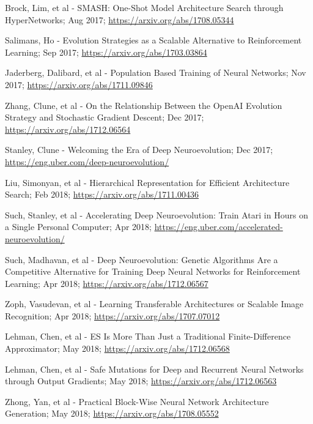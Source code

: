 \documentclass[journal, a4paper]{IEEEtran}
\begin{document}
\begin{thebibliography}{5}
    Brock, Lim, et al - SMASH: One-Shot Model Architecture Search through HyperNetworks; Aug 2017;
    \url{https://arxiv.org/abs/1708.05344}

    Salimans, Ho - Evolution Strategies as a Scalable Alternative to Reinforcement Learning; Sep 2017;
    \url{https://arxiv.org/abs/1703.03864}

    Jaderberg, Dalibard, et al - Population Based Training of Neural Networks; Nov 2017;
    \url{https://arxiv.org/abs/1711.09846}

    Zhang, Clune, et al - On the Relationship Between the OpenAI Evolution Strategy and Stochastic Gradient Descent; Dec 2017;
    \url{https://arxiv.org/abs/1712.06564}

    Stanley, Clune - Welcoming the Era of Deep Neuroevolution; Dec 2017;
    \url{https://eng.uber.com/deep-neuroevolution/}

    Liu, Simonyan, et al - Hierarchical Representation for Efficient Architecture Search; Feb 2018;
    \url{https://arxiv.org/abs/1711.00436}

    Such, Stanley, et al - Accelerating Deep Neuroevolution: Train Atari in Hours on a Single Personal Computer; Apr 2018;
    \url{https://eng.uber.com/accelerated-neuroevolution/}

    Such, Madhavan, et al - Deep Neuroevolution: Genetic Algorithms Are a Competitive Alternative for Training Deep Neural Networks for Reinforcement Learning; Apr 2018;
    \url{https://arxiv.org/abs/1712.06567}

    Zoph, Vasudevan, et al - Learning Transferable Architectures or Scalable Image Recognition; Apr 2018;
    \url{https://arxiv.org/abs/1707.07012}

    Lehman, Chen, et al - ES Is More Than Just a Traditional Finite-Difference Approximator; May 2018;
    \url{https://arxiv.org/abs/1712.06568}

    Lehman, Chen, et al - Safe Mutations for Deep and Recurrent Neural Networks through Output Gradients; May 2018;
    \url{https://arxiv.org/abs/1712.06563}

    Zhong, Yan, et al - Practical Block-Wise Neural Network Architecture Generation; May 2018;
    \url{https://arxiv.org/abs/1708.05552}


\end{thebibliography}
\end{document}
